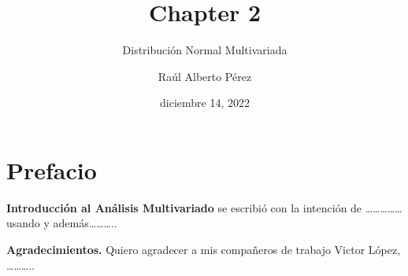 \documentclass[
]{book}
\title{Chapter 2}
\subtitle{Distribución Normal Multivariada}
\author{Raúl Alberto Pérez}
\date{diciembre 14, 2022}
\theoremstyle{definition}
\theoremstyle{definition}
\theoremstyle{definition}
\theoremstyle{definition}
\theoremstyle{remark}
\begin{document}
\maketitle


\thispagestyle{empty}

\setlength{\abovedisplayskip}{-5pt}
\setlength{\abovedisplayshortskip}{-5pt}

{
\hypersetup{linkcolor=}
\setcounter{tocdepth}{2}
\tableofcontents
}
\hypertarget{prefacio}{%
\chapter*{Prefacio}\label{prefacio}}


\textbf{Introducción al Análisis Multivariado} se escribió con la intención de \ldots\ldots\ldots\ldots\ldots{} usando \citep{R-base} y además\ldots\ldots\ldots..

\textbf{Agradecimientos.} Quiero agradecer a mis compañeros de trabajo Victor López, \ldots\ldots\ldots..
\end{document}
